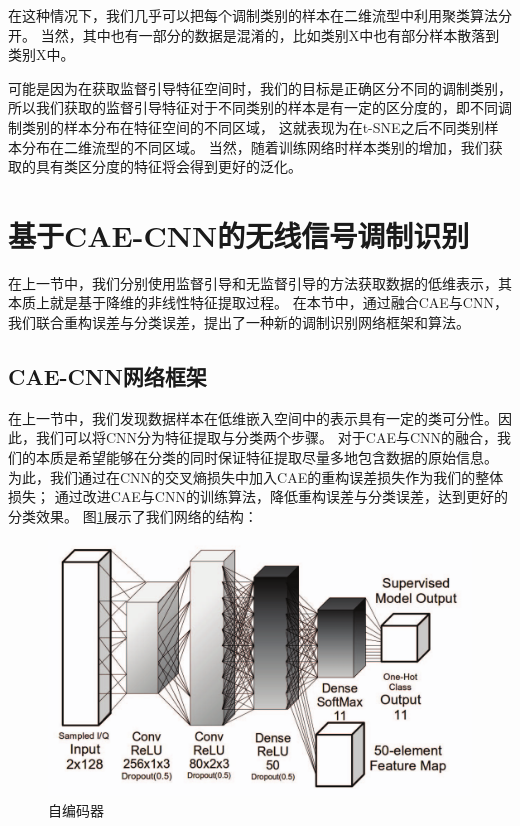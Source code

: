 在这种情况下，我们几乎可以把每个调制类别的样本在二维流型中利用聚类算法分开。
当然，其中也有一部分的数据是混淆的，比如类别X中也有部分样本散落到类别X中。\par
可能是因为在获取监督引导特征空间时，我们的目标是正确区分不同的调制类别，
所以我们获取的监督引导特征对于不同类别的样本是有一定的区分度的，即不同调制类别的样本分布在特征空间的不同区域，
这就表现为在t-SNE之后不同类别样本分布在二维流型的不同区域。
当然，随着训练网络时样本类别的增加，我们获取的具有类区分度的特征将会得到更好的泛化。\par


\section{基于CAE-CNN的无线信号调制识别}

在上一节中，我们分别使用监督引导和无监督引导的方法获取数据的低维表示，其本质上就是基于降维的非线性特征提取过程。
在本节中，通过融合CAE与CNN，我们联合重构误差与分类误差，提出了一种新的调制识别网络框架和算法。

\subsection{CAE-CNN网络框架}
在上一节中，我们发现数据样本在低维嵌入空间中的表示具有一定的类可分性。因此，我们可以将CNN分为特征提取与分类两个步骤。
对于CAE与CNN的融合，我们的本质是希望能够在分类的同时保证特征提取尽量多地包含数据的原始信息。
为此，我们通过在CNN的交叉熵损失中加入CAE的重构误差损失作为我们的整体损失；
通过改进CAE与CNN的训练算法，降低重构误差与分类误差，达到更好的分类效果。
图\ref{sec:fig_3_8}展示了我们网络的结构：
\begin{figure}[!h]
	\centering
	\includegraphics[scale=0.3]{figures/chapter_3/cae_cnn_frame}
	\caption{自编码器}	\label{sec:fig_3_8}
\end{figure}

